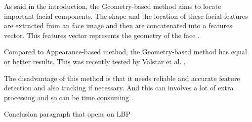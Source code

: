 \noindent As said in the introduction, the Geometry-based method aims to locate important facial components. The shape and the location of these facial features are extracted from an face image and then are concatenated into a features vector. This features vector represents the geometry of the face \cite{SHA09}.
\newline

\noindent Compared to Appearance-based method, the Geometry-based method has equal or better results. This was recently tested by Valstar et al. \cite{VAL05} \cite{VAL06}.
\newline

\noindent The disadvantage of this method is that it needs reliable and accurate feature detection and also tracking if necessary. And this can involves a lot of extra processing and so can be time consuming \cite{SHA09}.
\newline

\noindent Conclusion paragraph that opens on LBP

